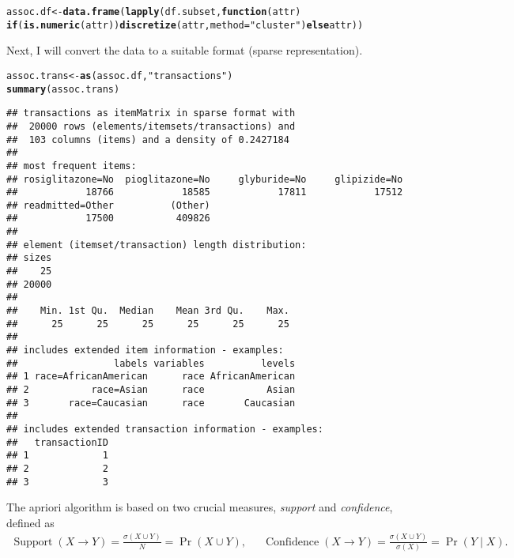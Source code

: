 \documentclass{article}\usepackage[]{graphicx}\usepackage[]{color}
\makeatletter
\newcommand{\hlstr}[1]{\textcolor[rgb]{0.192,0.494,0.8}{#1}}%
\newcommand{\hlstd}[1]{\textcolor[rgb]{0.345,0.345,0.345}{#1}}%
\newcommand{\hlkwa}[1]{\textcolor[rgb]{0.161,0.373,0.58}{\textbf{#1}}}%
\newcommand{\hlkwb}[1]{\textcolor[rgb]{0.69,0.353,0.396}{#1}}%
\newcommand{\hlkwc}[1]{\textcolor[rgb]{0.333,0.667,0.333}{#1}}%
\newcommand{\hlkwd}[1]{\textcolor[rgb]{0.737,0.353,0.396}{\textbf{#1}}}%
\newenvironment{kframe}{%
 \def\at@end@of@kframe{}%
 \ifinner\ifhmode%
  \def\at@end@of@kframe{\end{minipage}}%
  \begin{minipage}{\columnwidth}%
 \fi\fi%
 \def\FrameCommand##1{\hskip\@totalleftmargin \hskip-\fboxsep
 \colorbox{shadecolor}{##1}\hskip-\fboxsep
     \hskip-\linewidth \hskip-\@totalleftmargin \hskip\columnwidth}%
 \MakeFramed {\advance\hsize-\width
   \@totalleftmargin\z@ \linewidth\hsize
   \@setminipage}}%
 {\par\unskip\endMakeFramed%
 \at@end@of@kframe}
\newenvironment{knitrout}{}{} %
\makeatother
\begin{document}
\begin{knitrout}
\color{fgcolor}\begin{kframe}
\begin{alltt}
\hlstd{assoc.df} \hlkwb{<-} \hlkwd{data.frame}\hlstd{(}\hlkwd{lapply}\hlstd{(df.subset,} \hlkwa{function} \hlstd{(}\hlkwc{attr}\hlstd{)}
    \hlkwa{if} \hlstd{(}\hlkwd{is.numeric}\hlstd{(attr))} \hlkwd{discretize}\hlstd{(attr,} \hlkwc{method}\hlstd{=}\hlstr{"cluster"}\hlstd{)} \hlkwa{else} \hlstd{attr))}
\end{alltt}
\end{kframe}
\end{knitrout}

Next, I will convert the data to a suitable format (sparse representation).

\begin{knitrout}
\color{fgcolor}\begin{kframe}
\begin{alltt}
\hlstd{assoc.trans} \hlkwb{<-} \hlkwd{as}\hlstd{(assoc.df,} \hlstr{"transactions"}\hlstd{)}
\hlkwd{summary}\hlstd{(assoc.trans)}
\end{alltt}
\begin{verbatim}
## transactions as itemMatrix in sparse format with
##  20000 rows (elements/itemsets/transactions) and
##  103 columns (items) and a density of 0.2427184 
## 
## most frequent items:
## rosiglitazone=No  pioglitazone=No     glyburide=No     glipizide=No 
##            18766            18585            17811            17512 
## readmitted=Other          (Other) 
##            17500           409826 
## 
## element (itemset/transaction) length distribution:
## sizes
##    25 
## 20000 
## 
##    Min. 1st Qu.  Median    Mean 3rd Qu.    Max. 
##      25      25      25      25      25      25 
## 
## includes extended item information - examples:
##                 labels variables          levels
## 1 race=AfricanAmerican      race AfricanAmerican
## 2           race=Asian      race           Asian
## 3       race=Caucasian      race       Caucasian
## 
## includes extended transaction information - examples:
##   transactionID
## 1             1
## 2             2
## 3             3
\end{verbatim}
\end{kframe}
\end{knitrout}

The apriori algorithm is based on two crucial measures, \emph{support} and
\emph{confidence}, defined as
\begin{align*}
  \operatorname{Support}(X \rightarrow Y) = \frac{\sigma(X \cup Y)}{N} = \Pr(X
  \cup Y)\text{,} &&
                     \operatorname{Confidence}(X \rightarrow Y) = \frac{\sigma(X \cup Y)}{\sigma(X)}
                     =
                     \Pr(Y
                     \mid X)\text{.}
\end{align*}
\end{document}
